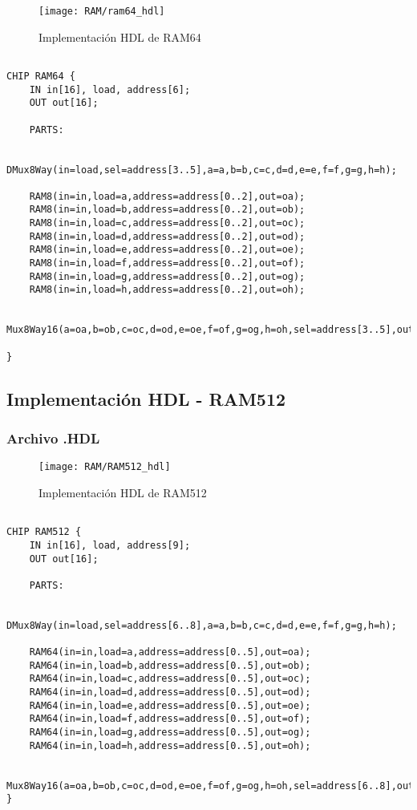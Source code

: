 \documentclass[12pt]{article}
\begin{document}
\begin{figure}[H]
	\centering
	\texttt{[image: RAM/ram64\_hdl]}
	\caption{Implementación HDL de RAM64}
	\label{fig:ram64hdl}
\end{figure}
        \begin{lstlisting}

CHIP RAM64 {
	IN in[16], load, address[6];
	OUT out[16];

	PARTS:

	DMux8Way(in=load,sel=address[3..5],a=a,b=b,c=c,d=d,e=e,f=f,g=g,h=h);

	RAM8(in=in,load=a,address=address[0..2],out=oa);
	RAM8(in=in,load=b,address=address[0..2],out=ob);
	RAM8(in=in,load=c,address=address[0..2],out=oc);
	RAM8(in=in,load=d,address=address[0..2],out=od);
	RAM8(in=in,load=e,address=address[0..2],out=oe);
	RAM8(in=in,load=f,address=address[0..2],out=of);
	RAM8(in=in,load=g,address=address[0..2],out=og);
	RAM8(in=in,load=h,address=address[0..2],out=oh);

	Mux8Way16(a=oa,b=ob,c=oc,d=od,e=oe,f=of,g=og,h=oh,sel=address[3..5],out=out);

}

        \end{lstlisting}

\subsection{Implementación HDL - RAM512}
  	\subsubsection{Archivo .HDL}

\begin{figure}[H]
	\centering
	\texttt{[image: RAM/RAM512\_hdl]}
	\caption{Implementación HDL de RAM512}
	\label{fig:ram512hdl}
\end{figure}

  	\begin{lstlisting}

CHIP RAM512 {
	IN in[16], load, address[9];
	OUT out[16];

	PARTS:

	DMux8Way(in=load,sel=address[6..8],a=a,b=b,c=c,d=d,e=e,f=f,g=g,h=h);

	RAM64(in=in,load=a,address=address[0..5],out=oa);
	RAM64(in=in,load=b,address=address[0..5],out=ob);
	RAM64(in=in,load=c,address=address[0..5],out=oc);
	RAM64(in=in,load=d,address=address[0..5],out=od);
	RAM64(in=in,load=e,address=address[0..5],out=oe);
	RAM64(in=in,load=f,address=address[0..5],out=of);
	RAM64(in=in,load=g,address=address[0..5],out=og);
	RAM64(in=in,load=h,address=address[0..5],out=oh);

	Mux8Way16(a=oa,b=ob,c=oc,d=od,e=oe,f=of,g=og,h=oh,sel=address[6..8],out=out);
}

  	\end{lstlisting}
\end{document}
